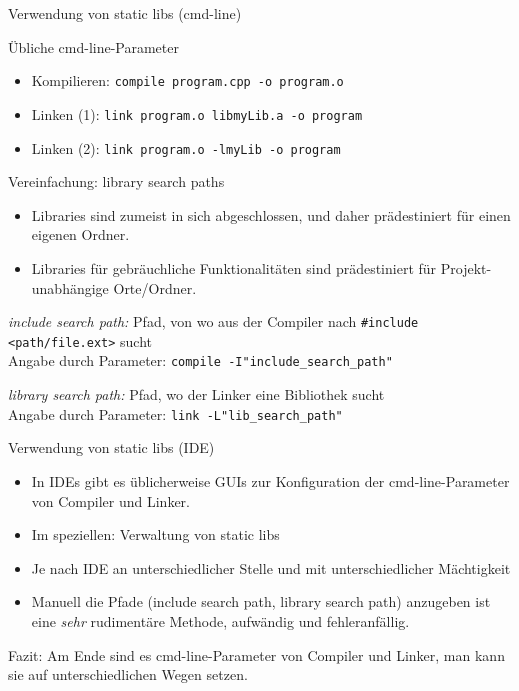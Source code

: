 \begin{frame}[fragile]{Verwendung von static libs (cmd-line)}
	\footnotesize
	
	\begin{block}{Übliche cmd-line-Parameter}
		\begin{itemize}
			\item Kompilieren: \verb|compile program.cpp -o program.o| \\
			\item Linken (1): \verb|link program.o libmyLib.a -o program| \\
			\item Linken (2): \verb|link program.o -lmyLib -o program|
		\end{itemize}
	\end{block}
	
	\pause
	
	\begin{block}{Vereinfachung: library search paths}
		\begin{itemize}
			\item Libraries sind zumeist in sich abgeschlossen, und daher prädestiniert für einen eigenen Ordner.
			\item Libraries für gebräuchliche Funktionalitäten sind prädestiniert für Projekt-unabhängige Orte/Ordner.
		\end{itemize}
		
		\pause
		
		\emph{include search path:} Pfad, von wo aus der Compiler nach {\tiny \verb|#include <path/file.ext>| } sucht \\
		Angabe durch Parameter: \verb|compile -I"include_search_path"|
		
		\pause
		\vspace{0.5em}
		
		\emph{library search path:} Pfad, wo der Linker eine Bibliothek sucht \\
		Angabe durch Parameter: \verb|link -L"lib_search_path"|
	\end{block}
\end{frame}

\begin{frame}{Verwendung von static libs (IDE)}
	\begin{itemize}[<+->]
		\item In IDEs gibt es üblicherweise GUIs zur Konfiguration der cmd-line-Parameter von Compiler und Linker.
		\item Im speziellen: Verwaltung von static libs
		\item Je nach IDE an unterschiedlicher Stelle und mit unterschiedlicher Mächtigkeit
		\item \alert{ Manuell die Pfade {\tiny (include search path, library search path) } anzugeben ist eine \emph{sehr} rudimentäre Methode, aufwändig und fehleranfällig. }
	\end{itemize}
	
	\vspace{2em}
	
	\uncover<+->
	{
		Fazit: Am Ende sind es cmd-line-Parameter von Compiler und Linker, man kann sie auf unterschiedlichen Wegen setzen.
	}
\end{frame}

